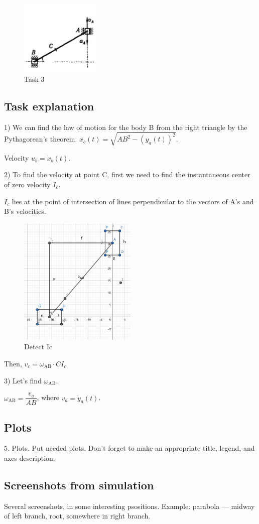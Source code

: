\documentclass{article}
\begin{document}
\begin{figure}[H]
    \centering
    \includegraphics[width=0.35\textwidth]{Task3.png}
    \caption{Task 3}
\end{figure}


\subsection{Task explanation}

1) We can find the law of motion for the body B from the right triangle by the Pythagorean's theorem. 
$x_{b}(t) = \sqrt{AB^{2} - (y_{a}(t))^{2}}$.

Velocity $u_b = \dot x_{b}(t)$.

2) To find the velocity at point C, first we need to find the instantaneous center of zero velocity $I_c$.

$I_c$ lies at the point of intersection of lines perpendicular to the vectors of A's and B's velocities.


\begin{figure}
    \centering
    \includegraphics[width=0.5\textwidth]{Task3_mechanism.png}
    \caption{Detect Ic}
\end{figure} 

Then, \( v_c = \omega_\text{AB} \cdot CI_c\)

3) Let's find $\omega_\text{AB}$. 

$\omega_\text{AB} = \dfrac{v_a}{AB}$, where $v_a = \dot{y}_a(t)$.
\subsection{Plots}
5. Plots. Put needed plots. Don’t forget to make an appropriate title, legend, and axes description.
\subsection{Screenshots from simulation}

Several screenshots, in some interesting psositions. Example: parabola —
midway of left branch, root, somewhere in right branch.
\end{document}
